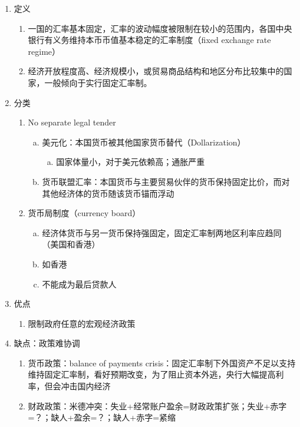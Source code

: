 \documentclass[12pt]{book}
\begin{document}
\begin{enumerate}[1.]
    \item 定义
          \begin{enumerate}[(1)]
              \item 一国的汇率基本固定，汇率的波动幅度被限制在较小的范围内，各国中央银行有义务维持本币币值基本稳定的汇率制度（fixed exchange rate regime）
              \item 经济开放程度⾼、经济规模⼩，或贸易商品结构和地区分布⽐较集中的国家，⼀般倾向于实⾏固定汇率制。
          \end{enumerate}
    \item 分类
          \begin{enumerate}[(1)]
              \item No separate legal tender
                    \begin{enumerate}[a.]
                        \item 美元化：本国货币被其他国家货币替代（Dollarization）
                              \begin{enumerate}[(a)]
                                  \item 国家体量小，对于美元依赖高；通胀严重
                              \end{enumerate}
                        \item 货币联盟汇率：本国货币与主要贸易伙伴的货币保持固定比价，而对其他经济体的货币随该货币锚而浮动
                    \end{enumerate}
              \item 货币局制度（currency board）
                    \begin{enumerate}[a.]
                        \item 经济体货币与另一货币保持强固定，固定汇率制两地区利率应趋同（美国和香港）
                        \item 如香港
                        \item 不能成为最后贷款人
                    \end{enumerate}
          \end{enumerate}
    \item 优点
          \begin{enumerate}[(1)]
              \item 限制政府任意的宏观经济政策
          \end{enumerate}
    \item 缺点：政策难协调
          \begin{enumerate}[(1)]
              \item 货币政策：balance of payments crisis：固定汇率制下外国资产不足以支持维持固定汇率制，看好预期改变，为了阻止资本外逃，央行大幅提高利率，但会冲击国内经济
              \item 财政政策：米德冲突：失业+经常账户盈余=财政政策扩张；失业+赤字=？；缺人+盈余=？；缺人+赤字=紧缩
          \end{enumerate}
\end{enumerate}
\end{document}
